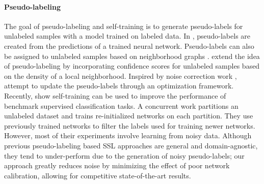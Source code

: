 \documentclass{article} \usepackage{iclr2021_conference,times}
\begin{document}
\label{sect:relatedworks}

\paragraph{Pseudo-labeling}
The goal of pseudo-labeling \citep{Lee2013PseudoLabelT, Shi_2018_ECCV} and self-training \citep{yarowsky-1995-unsupervised, mcclosky-etal-2006-effective} is to generate pseudo-labels for unlabeled samples with a model trained on labeled data. In \citep{Lee2013PseudoLabelT}, pseudo-labels are created from the predictions of a trained neural network. Pseudo-labels can also be assigned to unlabeled samples based on neighborhood graphs \citep{Iscen2019LabelPF}. \citet{Shi_2018_ECCV} extend the idea of pseudo-labeling by incorporating confidence scores for unlabeled samples based on the density of a local neighborhood. Inspired by noise correction work \citep{yi2019probabilistic}, \citet{R2D2_AAAI_2020} attempt to update the pseudo-labels through an optimization framework. Recently, \citep{xie2019self} show self-training can be used to improve the performance of benchmark supervised classification tasks. A concurrent work \citep{HaaseSchutz2020IterativeLI} partitions an unlabeled dataset and trains re-initialized networks on each partition. They use previously trained networks to filter the labels used for training newer networks. However, most of their experiments involve learning from noisy data. Although previous pseudo-labeling based SSL approaches are general and domain-agnostic, they tend to under-perform due to the generation of noisy pseudo-labels; our approach greatly reduces noise by minimizing the effect of poor network calibration, allowing for competitive state-of-the-art results. 
\end{document}
